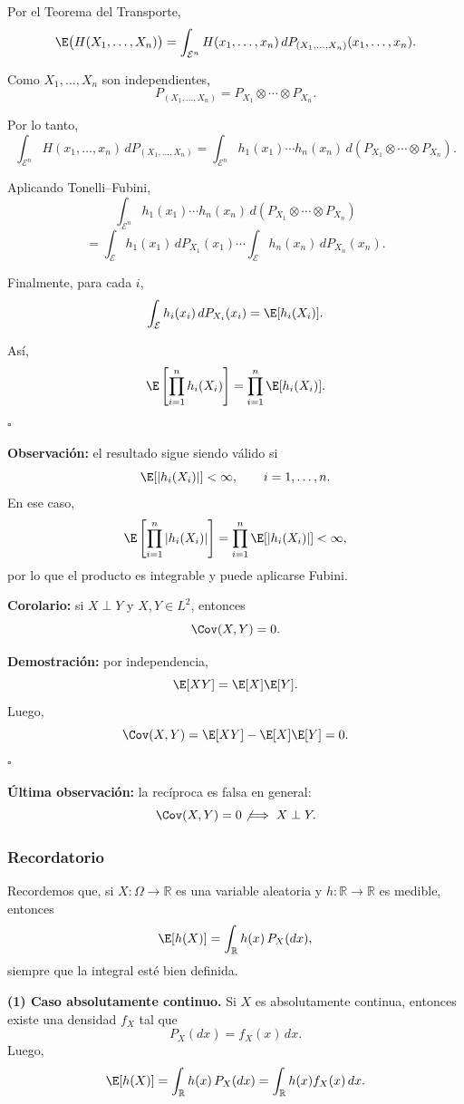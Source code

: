 Por el Teorema del Transporte,
\[
\E\big(H(X_1,\dots,X_n)\big)
=
\int_{\mathcal{E}^n} H(x_1,\dots,x_n)\,dP_{(X_1,\dots,X_n)}(x_1,\dots,x_n).
\]

Como $X_1,\dots,X_n$ son independientes,
\[
P_{(X_1,\dots,X_n)}
=
P_{X_1}\otimes\cdots\otimes P_{X_n}.
\]

Por lo tanto,
\[
\int_{\mathcal{E}^n} H(x_1,\dots,x_n)\,dP_{(X_1,\dots,X_n)}
=
\int_{\mathcal{E}^n} h_1(x_1)\cdots h_n(x_n)\,d(P_{X_1}\otimes\cdots\otimes P_{X_n}).
\]

Aplicando Tonelli--Fubini,
\[
\int_{\mathcal{E}^n} h_1(x_1)\cdots h_n(x_n)\,d(P_{X_1}\otimes\cdots\otimes P_{X_n})
\]
\[
=
\int_{\mathcal{E}} h_1(x_1)\,dP_{X_1}(x_1)\cdots
\int_{\mathcal{E}} h_n(x_n)\,dP_{X_n}(x_n).
\]

Finalmente, para cada $i$,
\[
\int_{\mathcal{E}} h_i(x_i)\,dP_{X_i}(x_i)=\E[h_i(X_i)].
\]

Así,
\[
\E\left[\prod_{i=1}^n h_i(X_i)\right]
=
\prod_{i=1}^n \E[h_i(X_i)].
\]
\hfill $\square$

\medskip

\noindent
\textbf{Observación:} el resultado sigue siendo válido si
\[
\E[|h_i(X_i)|]<\infty,
\qquad i=1,\dots,n.
\]
En ese caso,
\[
\E\left[\prod_{i=1}^n |h_i(X_i)|\right]
=
\prod_{i=1}^n \E[|h_i(X_i)|]
<\infty,
\]
por lo que el producto es integrable y puede aplicarse Fubini.

\medskip

\noindent
\textbf{Corolario:} si $X\perp Y$ y $X,Y\in L^2$, entonces
\[
\Cov(X,Y)=0.
\]

\textbf{Demostración:} por independencia,
\[
\E[XY]=\E[X]\E[Y].
\]
Luego,
\[
\Cov(X,Y)=\E[XY]-\E[X]\E[Y]=0.
\]
\hfill $\square$

\medskip

\noindent
\textbf{Última observación:} la recíproca es falsa en general:
\[
\Cov(X,Y)=0 \not\implies X\perp Y.
\]

\subsubsection*{Recordatorio}

Recordemos que, si $X:\Omega\to\mathbb{R}$ es una variable aleatoria y $h:\mathbb{R}\to\mathbb{R}$ es medible, entonces
\[
\E[h(X)] = \int_{\mathbb{R}} h(x)\,P_X(dx),
\]
siempre que la integral esté bien definida.

\medskip

\noindent
\textbf{(1) Caso absolutamente continuo.}  
Si $X$ es absolutamente continua, entonces existe una densidad $f_X$ tal que
\[
P_X(dx)=f_X(x)\,dx.
\]
Luego,
\[
\E[h(X)]
=
\int_{\mathbb{R}} h(x)\,P_X(dx)
=
\int_{\mathbb{R}} h(x)f_X(x)\,dx.
\]

